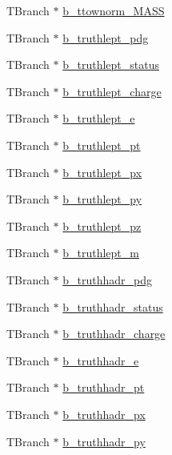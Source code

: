 \begin{DoxyCompactItemize}
\item 
T\+Branch $\ast$ \hyperlink{classCollectionTree_acaee0dda4147b581f635147ad6dc51d6}{b\+\_\+ttownorm\+\_\+\+M\+A\+SS}
\item 
T\+Branch $\ast$ \hyperlink{classCollectionTree_ac2c9c8e72b17917e0c9724e8ae624c70}{b\+\_\+truthlept\+\_\+pdg}
\item 
T\+Branch $\ast$ \hyperlink{classCollectionTree_a7be397a5079e1d153f4427f8de531d51}{b\+\_\+truthlept\+\_\+status}
\item 
T\+Branch $\ast$ \hyperlink{classCollectionTree_ad67fefc65ddc0677ef0379ac12a94876}{b\+\_\+truthlept\+\_\+charge}
\item 
T\+Branch $\ast$ \hyperlink{classCollectionTree_a6eee79e449b1a3168b4a8fbb94dda627}{b\+\_\+truthlept\+\_\+e}
\item 
T\+Branch $\ast$ \hyperlink{classCollectionTree_aec945ac6de959958af82ddd773ddd394}{b\+\_\+truthlept\+\_\+pt}
\item 
T\+Branch $\ast$ \hyperlink{classCollectionTree_aa763bf7be845f49913db3034ca79c31a}{b\+\_\+truthlept\+\_\+px}
\item 
T\+Branch $\ast$ \hyperlink{classCollectionTree_a8cc3d54a5cca583cc512fdefb0825b08}{b\+\_\+truthlept\+\_\+py}
\item 
T\+Branch $\ast$ \hyperlink{classCollectionTree_aad4979473188695ee43142415c791969}{b\+\_\+truthlept\+\_\+pz}
\item 
T\+Branch $\ast$ \hyperlink{classCollectionTree_a76fbc1259a3d6964e784e2f522c101b2}{b\+\_\+truthlept\+\_\+m}
\item 
T\+Branch $\ast$ \hyperlink{classCollectionTree_a9c34c06b02553163dd227b23ec6ac8b5}{b\+\_\+truthhadr\+\_\+pdg}
\item 
T\+Branch $\ast$ \hyperlink{classCollectionTree_ab7c353631d37be2a52e2bc30f3a275c3}{b\+\_\+truthhadr\+\_\+status}
\item 
T\+Branch $\ast$ \hyperlink{classCollectionTree_ad433cd1334a33539df830988855e3cb0}{b\+\_\+truthhadr\+\_\+charge}
\item 
T\+Branch $\ast$ \hyperlink{classCollectionTree_ab186945b0d670ee0273fe084e447c6c0}{b\+\_\+truthhadr\+\_\+e}
\item 
T\+Branch $\ast$ \hyperlink{classCollectionTree_add6e01e812ae7baab8c1deb827d27ee6}{b\+\_\+truthhadr\+\_\+pt}
\item 
T\+Branch $\ast$ \hyperlink{classCollectionTree_a3057d3e953c4103437d5e3bd0c63839c}{b\+\_\+truthhadr\+\_\+px}
\item 
T\+Branch $\ast$ \hyperlink{classCollectionTree_af042cb479d707f5d734cdd707115552f}{b\+\_\+truthhadr\+\_\+py}

\end{DoxyCompactItemize}
